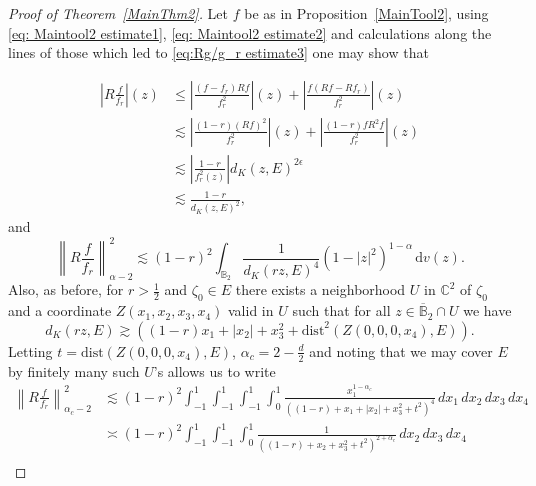\documentclass[a4paper,12pt]{amsart}
\theoremstyle{definition}
\theoremstyle{remark}
\def\C{\mathbb C}
\def\B{\mathbb{B}}
\begin{document}
\begin{proof} [Proof of Theorem~\ref{MainThm2}]
    Let $f$ be as in Proposition~{\ref{MainTool2}}, using \eqref{eq: Maintool2 estimate1}, \eqref{eq: Maintool2 estimate2} and calculations along the lines of those which led to \eqref{eq:Rg/g_r estimate3} one may show that

    \begin{equation} \label{eq: Rg/g_r estimate2}
    \begin{aligned}
        \left| R \frac{f}{f_r} \right|(z) &\leq  \left|  \frac{(f-f_r) Rf}{f^2_r} \right|(z) + \left|  \frac{ f (Rf - Rf_r) }{f^2_r} \right|(z) \\
        &\lesssim \left|  \frac{(1-r) (Rf)^2}{f^2_r} \right|(z) + \left|  \frac{ (1-r) f R^2f }{f^2_r} \right|(z) \\
        &\lesssim \left|\frac{1-r}{f^2_r(z)}\right| d_K(z,E)^{2 \epsilon}    \\
        &\lesssim \frac{1-r}{d_K(z,E)^2},
    \end{aligned}
    \end{equation}
    and
    \begin{equation} \label{eq: shabih2}
        \left\| R \frac{f}{f_r} \right\|_{\alpha - 2}^2 \lesssim (1-r)^2 \int_{\B_2}  \frac{1}{d_K(rz,E)^{4}}   (1-|z|^2)^{1-\alpha}\, \mathrm{d}v(z).
    \end{equation}
    Also, as before, for $r > \frac{1}{2}$ and $\zeta_0 \in E$ there exists a neighborhood $U$ in $\C^2$ of $\zeta_0$ and a coordinate $Z(x_1,x_2,x_3,x_4)$ valid in $U$ such that for all $z \in \overline{\B}_2 \cap U$ we have
    \begin{equation*}
        d_K(rz,E) \gtrsim \left((1-r)x_1 +|x_2| + x_3^2 + \mathrm{dist}^2(Z(0,0,0,x_4),E)\right).
    \end{equation*}
    Letting $t = \mathrm{dist}(Z(0,0,0,x_4),E)$, $\alpha_c = 2 -\frac{d}{2}$ and noting that we may cover $E$ by finitely many such $U$'s allows us to write
    \begin{equation}
        \begin{aligned}
            \left\| R \frac{f}{f_r} \right\|^2_{\alpha_c - 2}
        &\lesssim (1 - r)^2 \int_{-1}^1 \int_{-1}^1 \int_{-1}^1 \int_0^1 
        \frac{x_1^{1 - \alpha_c}}{((1-r) + x_1 + |x_2| + x_3^2 + t^2)^{4}} \, dx_1\, dx_2\, dx_3\, dx_4 \\
        &\asymp (1 - r)^2 \int_{-1}^1 \int_{-1}^1 \int_{0}^1  
        \frac{1}{((1-r) + x_2 + x_3^2 + t^2)^{2 + \alpha_c}} \, dx_2\, dx_3\, dx_4 \\

\end{aligned}
\end{equation}
\end{proof}
\end{document}

